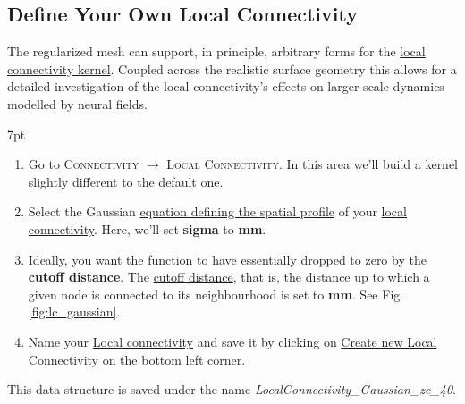 \documentclass{tufte-handout}
\newenvironment{formal}{%
  \def\FrameCommand{%
    \hspace{1pt}%
    {\color{DarkBlue}\vrule width 2pt}%
    {\color{formalshade}\vrule width 4pt}%
    \colorbox{formalshade}%
  }%
  \MakeFramed{\advance\hsize-\width\FrameRestore}%
  \noindent\hspace{-4.55pt}%
  \begin{adjustwidth}{}{7pt}%
  \vspace{2pt}\vspace{2pt}%
}
{%
  \vspace{2pt}\end{adjustwidth}\endMakeFramed%
}
\begin{document}
\subsection{Define Your Own Local Connectivity}\label{sec:local_connectivity}

The regularized mesh can support, in principle, arbitrary forms for the
\underline{local connectivity kernel}. Coupled across the realistic surface
geometry this allows for a detailed investigation of the local connectivity's
effects on larger scale dynamics modelled by neural fields.



\begin{formal}
\begin{enumerate}
\item Go to \textsc{Connectivity} $\rightarrow$ \textsc{Local Connectivity}. 
In this area we'll build a kernel slightly different to the default one. 
\item Select the Gaussian \underline{equation defining the spatial profile} of your \underline{local connectivity}. Here, we'll set \textbf{sigma} to \textbf{\unit[15]{mm}}.
\item Ideally, you want the function to have essentially dropped to zero by the \textbf{cutoff distance}. The \underline{cutoff distance}, that is, the distance up to which a given node is connected to its neighbourhood \citep{Spiegler_2013, Sanz-Leon_2014} is set to \textbf{\unit[40]{mm}}. See Fig. \ref{fig:lc_gaussian}.
\item Name your \underline{Local connectivity} and save it by clicking on \underline{Create new Local Connectivity} on the bottom left corner. 
\end{enumerate}
\end{formal}
This data structure is saved under the name \textit{LocalConnectivity\_Gaussian\_zc\_40}.
\end{document}
